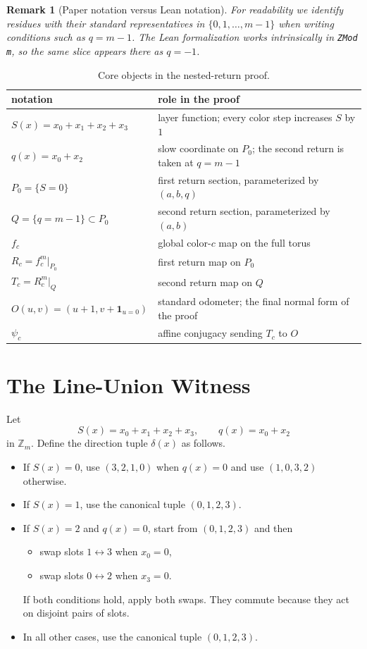 \documentclass[11pt]{article}
\newtheorem{remark}[theorem]{Remark}
\newcommand{\Zm}{\mathbb Z_m}
\newcommand{\I}{\mathbf 1}
\newcommand{\Pzero}{P_0}
\newcommand{\Qslice}{Q}
\begin{document}
\begin{remark}[Paper notation versus Lean notation]\label{rem:zmod}
For readability we identify residues with their standard representatives in
$\{0,1,\dots,m-1\}$ when writing conditions such as $q=m-1$. The Lean
formalization works intrinsically in \texttt{ZMod m}, so the same slice appears
there as $q=-1$.
\end{remark}

\begin{table}[t]
\centering
\footnotesize
\begin{tabularx}{\textwidth}{@{}lX@{}}
\toprule
notation & role in the proof \\
\midrule
$S(x)=x_0+x_1+x_2+x_3$ & layer function; every color step increases $S$ by $1$ \\
$q(x)=x_0+x_2$ & slow coordinate on $\Pzero$; the second return is taken at $q=m-1$ \\
$\Pzero=\{S=0\}$ & first return section, parameterized by $(a,b,q)$ \\
$\Qslice=\{q=m-1\}\subset \Pzero$ & second return section, parameterized by $(a,b)$ \\
$f_c$ & global color-$c$ map on the full torus \\
$R_c=f_c^m|_{\Pzero}$ & first return map on $\Pzero$ \\
$T_c=R_c^m|_{\Qslice}$ & second return map on $\Qslice$ \\
$O(u,v)=(u+1,v+\I_{u=0})$ & standard odometer; the final normal form of the proof \\
$\psi_c$ & affine conjugacy sending $T_c$ to $O$ \\
\bottomrule
\end{tabularx}
\caption{Core objects in the nested-return proof.}
\label{tab:notation}
\end{table}

\section{The Line-Union Witness}\label{sec:witness}

Let
\[
S(x)=x_0+x_1+x_2+x_3,
\qquad
q(x)=x_0+x_2
\]
in $\Zm$. Define the direction tuple $\delta(x)$ as follows.
\begin{itemize}[leftmargin=2em]
\item If $S(x)=0$, use $(3,2,1,0)$ when $q(x)=0$ and use $(1,0,3,2)$ otherwise.
\item If $S(x)=1$, use the canonical tuple $(0,1,2,3)$.
\item If $S(x)=2$ and $q(x)=0$, start from $(0,1,2,3)$ and then
  \begin{itemize}[leftmargin=2em]
  \item swap slots $1 \leftrightarrow 3$ when $x_0=0$,
  \item swap slots $0 \leftrightarrow 2$ when $x_3=0$.
  \end{itemize}
  If both conditions hold, apply both swaps. They commute because they act on
  disjoint pairs of slots.
\item In all other cases, use the canonical tuple $(0,1,2,3)$.
\end{itemize}
\end{document}
